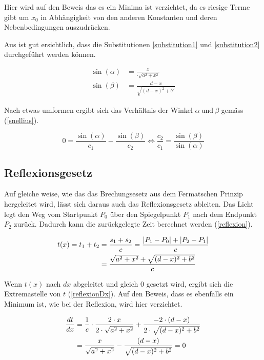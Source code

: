 Hier wird auf den Beweis das es ein Minima ist verzichtet, da es riesige Terme gibt um $x_0$ in Abhängigkeit von den anderen Konstanten und deren Nebenbedingungen auszudrücken.

Aus  ist gut ersichtlich, dass die Substitutionen \ref{substitution1} und \ref{substitution2} durchgeführt werden können.

\begin{align}
	\sin(\alpha) &= \frac{x}{\cdot \sqrt{a^2 + x^2}}  \label{substitution1}\\
	\sin(\beta) &= \frac{d-x}{\sqrt{(d -x)^2 + b^2}} \label{substitution2}
\end{align}

Nach etwas umformen ergibt sich das Verhältnis der Winkel $\alpha \ \text{und} \ \beta$ gemäss (\eqref{snellius}).

\begin{equation}
	0 = \frac{\sin(\alpha)}{c_1} - \frac{\sin(\beta)}{c_2} \Leftrightarrow\frac{c_2}{c_1} = \frac{\sin(\beta)}{\sin(\alpha)}
	\label{snellius}
\end{equation}


\subsection{Reflexionsgesetz}
\cite{Wikipedia} Auf gleiche weise, wie das das Brechungsesetz aus dem Fermatschen Prinzip hergeleitet wird, 
lässt sich daraus auch das Reflexionsgesetz ableiten.
Das Licht legt den Weg vom Startpunkt $P_0$ über den Spiegelpunkt $P_1$ 
nach dem Endpunkt $P_2$ zurück. Dadurch kann die zurückgelegte Zeit berechnet werden (\eqref{reflexion}).


\begin{align}
t(x) = t_1 + t_2 &= \frac{s_1 + s_2}{c} = \frac{|P_1 - P_0| + |P_2 - P_1|}{c} \notag \\
&= \frac{\sqrt{a^2 + x^2} + \sqrt{(d-x)^2 + b^2}}{c} \label{reflexion}
\end{align}

Wenn $t(x)$ nach $dx$ abgeleitet und gleich 0 gesetzt wird, ergibt sich die Extremastelle  von $t$ (\eqref{reflexionDx}). Auf den Beweis, dass es ebenfalls ein Minimum ist, wie bei der Reflexion, wird hier verzichtet.

\begin{align}
\frac{dt}{dx} &= \frac{1}{c} \cdot \frac{2 \cdot x}{2 \cdot \sqrt{a^2 + x^2}} + \frac{-2 \cdot (d-x)}{2 \cdot \sqrt{(d-x)^2 + b^2}} \notag \\
&= \frac{x}{ \sqrt{a^2 + x^2}} - \frac{(d-x)}{ \sqrt{(d-x)^2 + b^2}} = 0 \label{reflexionDx}
\end{align}


